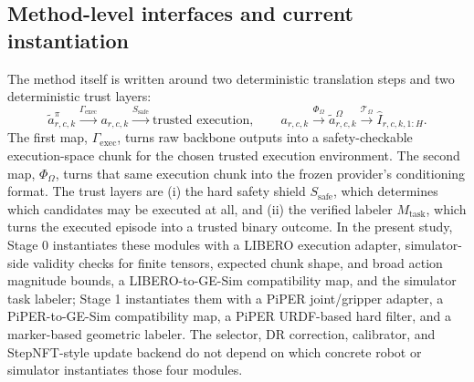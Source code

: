 \documentclass[10pt]{article}
\theoremstyle{plain}
\theoremstyle{definition}
\theoremstyle{remark}
\begin{document}
\subsection{Method-level interfaces and current instantiation}
The method itself is written around two deterministic translation steps and two deterministic trust layers:
\[
\tilde a^{\pi}_{r,c,k}\xrightarrow{\Gamma_{\mathrm{exec}}} a_{r,c,k}\xrightarrow{S_{\mathrm{safe}}}\text{trusted execution},
\qquad
 a_{r,c,k}\xrightarrow{\Phi_{\Omega}} \tilde a^{\Omega}_{r,c,k}\xrightarrow{\mathcal T_{\Omega}} \hat I_{r,c,k,1:H}.
\]
The first map, $\Gamma_{\mathrm{exec}}$, turns raw backbone outputs into a safety-checkable execution-space chunk for the chosen trusted execution environment. The second map, $\Phi_{\Omega}$, turns that same execution chunk into the frozen provider's conditioning format. The trust layers are (i) the hard safety shield $S_{\mathrm{safe}}$, which determines which candidates may be executed at all, and (ii) the verified labeler $M_{\mathrm{task}}$, which turns the executed episode into a trusted binary outcome. In the present study, Stage 0 instantiates these modules with a LIBERO execution adapter, simulator-side validity checks for finite tensors, expected chunk shape, and broad action magnitude bounds, a LIBERO-to-GE-Sim compatibility map, and the simulator task labeler; Stage 1 instantiates them with a PiPER joint/gripper adapter, a PiPER-to-GE-Sim compatibility map, a PiPER URDF-based hard filter, and a marker-based geometric labeler. The selector, DR correction, calibrator, and StepNFT-style update backend do not depend on which concrete robot or simulator instantiates those four modules.
\end{document}
